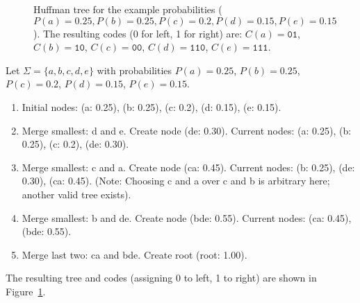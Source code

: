 \begin{figure}[hbtp]
    \caption[Huffman tree example]{Huffman tree for the example probabilities ($P(a)= 0.25, P(b)=0.25, P(c)=0.2, P(d)=0.15, P(e)=0.15$). The resulting codes (0 for left, 1 for right) are: $C(a)=\texttt{01}$, $C(b)=\texttt{10}$, $C(c)=\texttt{00}$, $C(d)=\texttt{110}$, $C(e)=\texttt{111}$.}
    \label{fig:huffman_tree_example} %
\end{figure}

\begin{example} \label{ex:huffman_construction}
    Let $\Sigma = \{a, b, c, d, e\}$ with probabilities $P(a)= 0.25$, $P(b)=0.25$, $P(c)=0.2$, $P(d)=0.15$, $P(e)=0.15$.
    \begin{enumerate}
        \item Initial nodes: (a: 0.25), (b: 0.25), (c: 0.2), (d: 0.15), (e: 0.15).
        \item Merge smallest: d and e. Create node (de: 0.30). Current nodes: (a: 0.25), (b: 0.25), (c: 0.2), (de: 0.30).
        \item Merge smallest: c and a. Create node (ca: 0.45). Current nodes: (b: 0.25), (de: 0.30), (ca: 0.45). (Note: Choosing c and a over c and b is arbitrary here; another valid tree exists).
        \item Merge smallest: b and de. Create node (bde: 0.55). Current nodes: (ca: 0.45), (bde: 0.55).
        \item Merge last two: ca and bde. Create root (root: 1.00).
    \end{enumerate}
    The resulting tree and codes (assigning 0 to left, 1 to right) are shown in Figure~\ref{fig:huffman_tree_example}.
\end{example}

